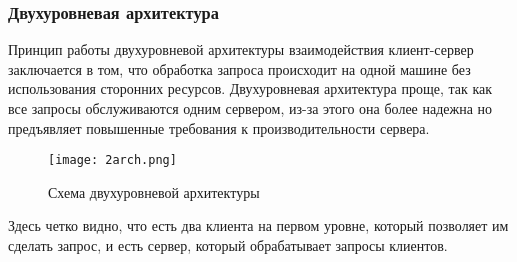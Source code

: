 \subsubsection{Двухуровневая архитектура}

Принцип работы двухуровневой архитектуры взаимодействия клиент-сервер заключается в том, что обработка запроса происходит на одной машине без использования сторонних ресурсов. Двухуровневая архитектура проще, так как все запросы обслуживаются одним сервером, из-за этого она более надежна но предъявляет повышенные требования к производительности сервера.

\begin{figure}[h!]
	\centering
	\texttt{[image: 2arch.png]}
	\caption{Схема двухуровневой архитектуры}
	\clearpage
\end{figure}

Здесь четко видно, что есть два клиента на первом уровне, который позволяет им сделать запрос, и есть сервер, который обрабатывает запросы клиентов.